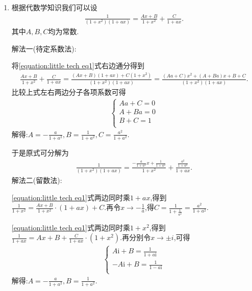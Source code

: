 \documentclass[../../main.tex]{subfiles}%
\begin{document}
\begin{solution}\label{将多项式分式分解为其部分因式的和常用方法}
\begin{enumerate}
\item 根据代数学知识我们可以设
\begin{align}\label{equation:little tech eq1}
\frac{1}{\left( 1+x^2 \right) \left( 1+ax \right)}=\frac{Ax+B}{1+x^2}+\frac{C}{1+ax}.  
\end{align}
其中$A,B,C$均为常数.

{\color{blue}解法一(待定系数法):}

将\eqref{equation:little tech eq1}式右边通分得到
\begin{align*}
\frac{Ax+B}{1+x^2}+\frac{C}{1+ax}=\frac{\left( Ax+B \right) \left( 1+ax \right) +C\left( 1+x^2 \right)}{\left( 1+x^2 \right) \left( 1+ax \right)}=\frac{\left( Aa+C \right) x^2+\left( A+Ba \right) x+B+C}{\left( 1+x^2 \right) \left( 1+ax \right)}.
\end{align*}
比较上式左右两边分子各项系数可得
\begin{align*}
\begin{cases}
Aa+C=0\\
A+Ba=0\\
B+C=1\\
\end{cases}
\end{align*}
解得:$A=-\frac{a}{1+a^2},B=\frac{1}{1+a^2},C=\frac{a^2}{1+a^2}$.

于是原式可分解为
\begin{align*}
\frac{1}{\left( 1+x^2 \right) \left( 1+ax \right)}=\frac{-\frac{a}{1+a^2}x+\frac{1}{1+a^2}}{1+x^2}+\frac{\frac{a^2}{1+a^2}}{1+ax}.
\end{align*}
{\color{blue}解法二(留数法):}

\eqref{equation:little tech eq1}式两边同时乘$1+ax$,得到$\frac{1}{1+x^2}=\frac{Ax+B}{1+x^2}\cdot \left( 1+ax \right) +C$.再令$x\to-\frac{1}{a}$,得$C=\frac{1}{1+\frac{1}{a^2}}=\frac{a^2}{1+a^2}$.

\eqref{equation:little tech eq1}式两边同时乘$1+x^2$,得到
$\frac{1}{1+ax}=Ax+B+\frac{C}{1+ax}\cdot \left( 1+x^2 \right)$.再分别令$x\to \pm i$,可得
\begin{align*}
\begin{cases}
A\mathrm{i}+B=\frac{1}{1+a\mathrm{i}}\\
-A\mathrm{i}+B=\frac{1}{1-a\mathrm{i}}\\
\end{cases}
\end{align*}
解得:$A=-\frac{a}{1+a^2},B=\frac{1}{1+a^2}$.


\end{enumerate}
\end{solution}
\end{document}
